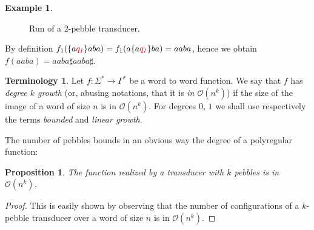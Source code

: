 \documentclass[sigplan,review,anonymous]{acmart}\settopmatter{printfolios=true,printccs=false,printacmref=false}
\newcommand{\Oo}{\mathcal O}
\newtheorem{proposition}[theorem]{Proposition}
\theoremstyle{definition}
\newtheorem{example}[theorem]{Example}
\newtheorem{terminology}[theorem]{Terminology}
\theoremstyle{remark}
\begin{document}
\begin{example}
\begin{figure}[h!]
\caption{Run of a $2$-pebble transducer.}
\label{fig:2peb}
\end{figure}

By definition $f_1(  \{a{\color{red!80!black}q_I}\}aba)=f_1(  a\{a{\color{red!80!black}q_I}\}ba)=aaba$, hence we obtain $f(aaba)= aaba\sharp aaba\sharp$.
\end{example}
  

\begin{terminology}
  Let $f:\Sigma^*\to \Gamma^*$ be a word to word function.
  We say that $f$ has \emph{degree $k$ growth} (or, abusing notations, that it is \emph{in $\Oo(n^k)$}) if the size of the image of a word of size $n$ is in $\Oo(n^k)$.
  For degrees $0$, $1$ we shall use respectively the terms \emph{bounded} and \emph{linear growth}.
  
\end{terminology}
The number of pebbles bounds in an obvious way the degree of a polyregular function:
\begin{proposition}
  \label{prop:degree}
The function realized by a transducer with $k$ pebbles is in $\Oo(n^k)$.
\end{proposition}


\begin{proof}
This is easily shown by observing that the number of configurations of a $k$-pebble transducer over a word of size $n$ is in $\Oo(n^k)$.
\end{proof}
\end{document}
